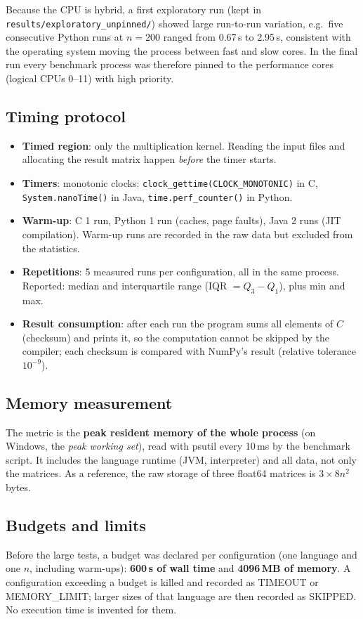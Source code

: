 \documentclass[11pt,a4paper]{article}
\begin{document}
Because the CPU is hybrid, a first exploratory run (kept in
\texttt{results/exploratory\_unpinned/}) showed large run-to-run variation, e.g.\ five
consecutive Python runs at $n = 200$ ranged from 0.67\,s to 2.95\,s, consistent with the
operating system moving the process between fast and slow cores. In the final run every
benchmark process was therefore pinned to the performance cores (logical CPUs 0--11) with
high priority.

\subsection{Timing protocol}
\begin{itemize}
  \item \textbf{Timed region}: only the multiplication kernel. Reading the input files
        and allocating the result matrix happen \emph{before} the timer starts.
  \item \textbf{Timers}: monotonic clocks: \texttt{clock\_gettime(CLOCK\_MONOTONIC)} in C,
        \texttt{System.nanoTime()} in Java, \texttt{time.perf\_counter()} in Python.
  \item \textbf{Warm-up}: C 1 run, Python 1 run (caches, page faults), Java 2 runs (JIT
        compilation). Warm-up runs are recorded in the raw data but excluded from the
        statistics.
  \item \textbf{Repetitions}: 5 measured runs per configuration, all in the same process.
        Reported: median and interquartile range (IQR $= Q_3 - Q_1$), plus min and max.
  \item \textbf{Result consumption}: after each run the program sums all elements of $C$
        (checksum) and prints it, so the computation cannot be skipped by the compiler;
        each checksum is compared with NumPy's result (relative tolerance $10^{-9}$).
\end{itemize}

\subsection{Memory measurement}
The metric is the \textbf{peak resident memory of the whole process} (on Windows, the
\emph{peak working set}), read with psutil \cite{psutil} every 10\,ms by the benchmark script. It
includes the language runtime (JVM, interpreter) and all data, not only the matrices.
As a reference, the raw storage of three float64 matrices is $3 \times 8n^2$ bytes.

\subsection{Budgets and limits}
Before the large tests, a budget was declared per configuration (one language and one
$n$, including warm-ups): \textbf{600\,s of wall time} and \textbf{4096\,MB of memory}.
A configuration exceeding a budget is killed and recorded as TIMEOUT or MEMORY\_LIMIT;
larger sizes of that language are then recorded as SKIPPED. No execution time is invented
for them.
\end{document}
